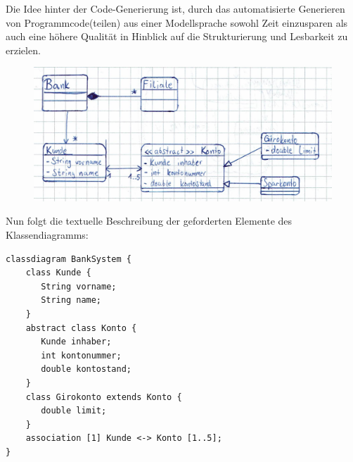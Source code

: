 Die Idee hinter der Code-Generierung ist, durch das automatisierte Generieren von Programmcode(teilen) aus
einer Modellsprache sowohl Zeit einzusparen als auch eine höhere Qualität in Hinblick auf die Strukturierung und Lesbarkeit zu erzielen.


\begin{figure}[h]
  \centering
  \includegraphics{3b_classdiag}
\end{figure}


\begin{minipage}{\linewidth}
Nun folgt die textuelle Beschreibung der geforderten Elemente des Klassendiagramms:\\
\begin{lstlisting}
classdiagram BankSystem {
    class Kunde {
       String vorname;
       String name;
    }
    abstract class Konto {
       Kunde inhaber;
       int kontonummer;
       double kontostand;
    }
    class Girokonto extends Konto {
       double limit;
    }
    association [1] Kunde <-> Konto [1..5];
}
\end{lstlisting}
\end{minipage}
